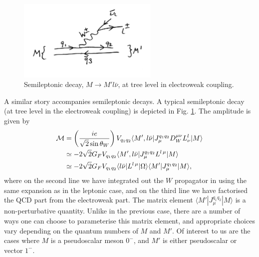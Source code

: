 \begin{figure}
  \vspace{-10pt}
  \begin{center}
    \includegraphics[width=0.6\textwidth]{images/semileptonicdecay.jpg}
  \end{center}
  \vspace{-30pt}
  \caption{Semileptonic decay, $M\to M'l\bar{\nu}$, at tree level in electroweak coupling.}
  \label{fig:semileptonicdecay}
\end{figure}

A similar story accompanies semileptonic decays. A typical semileptonic decay (at tree level in the electroweak coupling) is depicted in Fig. \ref{fig:semileptonicdecay}. The amplitude is given by
\begin{align}
  \nonumber
  \mathcal{M} & = \left( { ie \over \sqrt{2} \sin\theta_W }\right) V_{q_1q_2} \langle M', l\bar{\nu} | J_{\mu}^{q_1q_2} D_W^{\mu\nu} L^l_{\nu} | M \rangle \\
  \nonumber
  & \simeq -2\sqrt{2} G_F V_{q_1q_2} \langle M', l\bar{\nu} | J_{\mu}^{q_1q_2} L^{l\, \mu} | M \rangle \\
  & \simeq -2\sqrt{2} G_F V_{q_1q_2} \langle l\bar{\nu} | L^{l\,\mu} | \Omega \rangle \langle M' | J_{\mu}^{q_1q_2} | M \rangle,
  \label{eq:semileptonic}
\end{align}
where on the second line we have integrated out the $W$ propagator in using the same expansion as in the leptonic case, and on the third line we have factorised the QCD part from the electroweak part. The matrix element $\langle M' | J_{\mu}^{q_1q_2} | M \rangle$ is a non-perturbative quantity. Unlike in the previous case, there are a number of ways one can choose to parameterise this matrix element, and appropriate choices vary depending on the quantum numbers of $M$ and $M'$. Of interest to us are the cases where $M$ is a pseudoscalar meson $0^-$, and $M'$ is either pseudoscalar or vector $1^-$.


